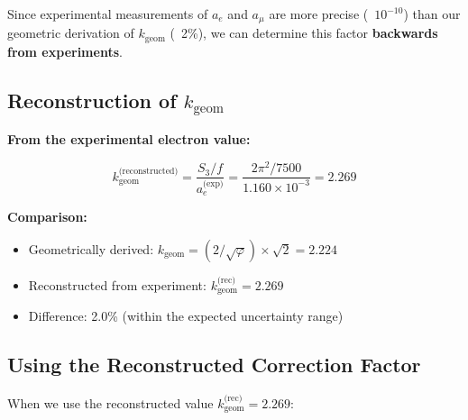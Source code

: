 	Since experimental measurements of $a_e$ and $a_\mu$ are more precise (~$10^{-10}$) than our geometric derivation of $k_{\text{geom}}$ (~2\%), we can determine this factor \textbf{backwards from experiments}.
	
	\subsection{Reconstruction of $k_{\text{geom}}$}
	
	\textbf{From the experimental electron value:}
	
	\begin{equation}
		k_{\text{geom}}^{\text{(reconstructed)}} = \frac{S_3/f}{a_e^{\text{(exp)}}} = \frac{2\pi^2 / 7500}{1.160 \times 10^{-3}} = 2.269
	\end{equation}
	
	\textbf{Comparison:}
	\begin{itemize}
		\item Geometrically derived: $k_{\text{geom}} = (2/\sqrt{\varphi}) \times \sqrt{2} = 2.224$
		\item Reconstructed from experiment: $k_{\text{geom}}^{\text{(rec)}} = 2.269$
		\item Difference: 2.0\% (within the expected uncertainty range)
	\end{itemize}
	
	\subsection{Using the Reconstructed Correction Factor}
	
	When we use the reconstructed value $k_{\text{geom}}^{\text{(rec)}} = 2.269$:
	
	\begin{table}[h]
		\centering
		\caption{Absolute values with geometric vs. reconstructed $k_{\text{geom}}$}
	\end{table}
	
